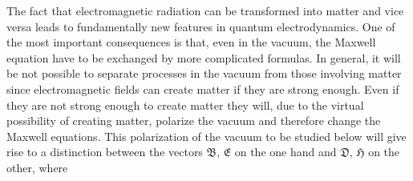 \documentclass{article}
\begin{document}
The fact that electromagnetic radiation can be transformed into matter and vice versa leads to
fundamentally new features in quantum electrodynamics.
One of the most important consequences is that, even in the vacuum, the
Maxwell equation have to be exchanged by more complicated formulas. In general,
it will be not possible to separate processes in the vacuum from those involving matter
since electromagnetic fields can create matter if they are strong enough. Even if they
are not strong enough to create matter they will, due to the virtual possibility
of creating matter, polarize the vacuum and therefore change the Maxwell equations.
This polarization of the vacuum to be studied below
will give rise to a
distinction between the vectors $\mathfrak B$, $\mathfrak E$
on the one hand and $\mathfrak D$, $\mathfrak H$ on the other, where%
\end{document}
